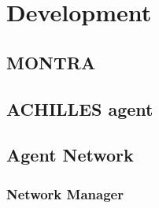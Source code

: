 \chapter{Development}
\label{chapter:development}

\section{MONTRA}

\section{ACHILLES agent}

\section{Agent Network}

\subsection{Network Manager}
%
